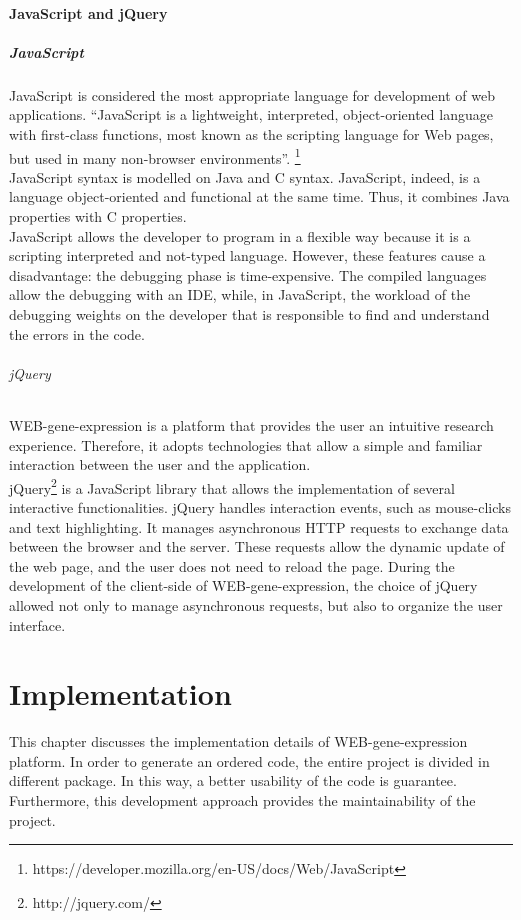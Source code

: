 \documentclass[a4paper]{report}
\begin{document}
\subsubsection{JavaScript and jQuery}

\paragraph{JavaScript}
JavaScript is considered the most appropriate language for development of web applications.
 ``JavaScript is a lightweight, interpreted, object-oriented language with first-class functions, most known as the scripting language for Web pages, but used in many non-browser environments''. \footnote{https://developer.mozilla.org/en-US/docs/Web/JavaScript}\\
JavaScript syntax is modelled on Java and C syntax. JavaScript, indeed, is a language object-oriented and functional at the same time. Thus, it combines Java properties with C properties.\\
JavaScript allows the developer to program in a flexible way because it is a scripting interpreted and not-typed language. However, these features cause a disadvantage: the debugging phase is time-expensive. The compiled languages allow the debugging with an IDE, while, in JavaScript, the workload of the debugging weights on the developer that is responsible to find and understand the errors in the code.

\subparagraph{jQuery}
 WEB-gene-expression is a platform that provides the user an intuitive research experience. Therefore, it adopts technologies that allow a simple and familiar interaction between the user and the application.\\
jQuery\footnote{http://jquery.com/} is a JavaScript library that allows the implementation of several interactive functionalities. jQuery handles interaction events, such as mouse-clicks and text highlighting. It manages asynchronous HTTP requests to exchange data between the browser and the server. These requests allow the dynamic update of the web page, and the user does not need to reload the page. During the development of the client-side of WEB-gene-expression, the choice of jQuery allowed not only to manage asynchronous requests, but also to organize the user interface. \\

\chapter{Implementation}
This chapter discusses the implementation details of WEB-gene-expression platform. In order to generate an ordered code, the entire project is divided in different package. In this way, a better usability of the code is guarantee. Furthermore, this development approach provides the maintainability of the project.
\end{document}
